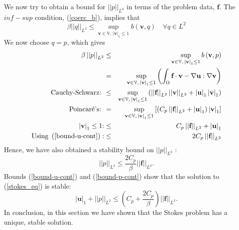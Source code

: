 \documentclass[12pt,a4paper]{article}
\theoremstyle{definition}
\begin{document}
We now try to obtain a bound for $\left|\left|p\right|\right|_{L^2}$ in terms of the problem data, $\textbf{f}$.  The $inf-sup$ condition, (\ref{coerc_b}), implies that
\begin{equation}\nonumber
\beta \left|\left|q\right|\right|_{L^2}\leq \sup_{\textbf{v}\in \mathbb{V}, \,\left|\textbf{v}\right|_{1}\leq1}  b\left(\textbf{v},q\right)\quad  \forall q \in L^2
\end{equation}
We now choose $q=p$, which gives 
\begin{eqnarray}\nonumber
\beta \left|\left|p\right|\right|_{L^2} &\leq& \sup_{\textbf{v}\in \mathbb{V}, \,\left|\textbf{v}\right|_1\leq1}  b\left(\textbf{v},p\right)\\\nonumber
&=& \sup_{\textbf{v}\in \mathbb{V}, \,\left|\textbf{v}\right|_1\leq1}  \left(\int_{\Omega}\textbf{f}\cdot\textbf{v} -\nabla\textbf{u}:\nabla\textbf{v}\right)\\\nonumber
\text{Cauchy-Schwarz: }&\leq& \sup_{\textbf{v}\in \mathbb{V}, \,\left|\textbf{v}\right|_1\leq1}  \left(\left|\left|\textbf{f}\right| \right|_{L^2} \left|\left|\textbf{v}\right|\right|_{L^2}+\left|\textbf{u}\right|_1 \left|\textbf{v}\right|_1\right)\\\nonumber
\text{Poincar\'e's: }&=&\sup_{\textbf{v}\in \mathbb{V}, \,\left|\textbf{v}\right|_1\leq1}  \left[\left(C_p\left|\left|\textbf{f}\right| \right|_{L^2}+ \left|\textbf{u}\right|_1\right) \left|\textbf{v}\right|_1\right] \\\nonumber
\left|\textbf{v}\right|_1\leq 1\text{:} &\leq&C_p\left|\left|\textbf{f}\right| \right|_{L^2}+ \left|\textbf{u}\right|_1\\\nonumber
\text{Using }\left(\ref{bound-u-cont}\right):&\leq&2C_p\left|\left|\textbf{f}\right| \right|_{L^2}
\end{eqnarray}
Hence, we have also obtained a stability bound on $\left|\left|p\right|\right|_{L^2}$ :
\begin{equation}\label{bound-p-cont}
\left|\left|p\right|\right|_{L^2} \leq \frac{2C_p}{\beta}\left|\left|\textbf{f}\right|\right|_{L^2}.
\end{equation}
Bounds (\ref{bound-u-cont}) and (\ref{bound-p-cont}) show that the solution to (\ref{stokes_eq}) is stable:
\begin{equation}
\left|\textbf{u}\right|_1+\left|\left|p\right|\right|_{L^2} \leq\left( C_p+\frac{2C_p}{\beta}\right)\left|\left|\textbf{f}\right|\right|_{L^2}.
\end{equation}
In conclusion, in this section we have shown that the Stokes problem has a unique, stable solution.
\end{document}

